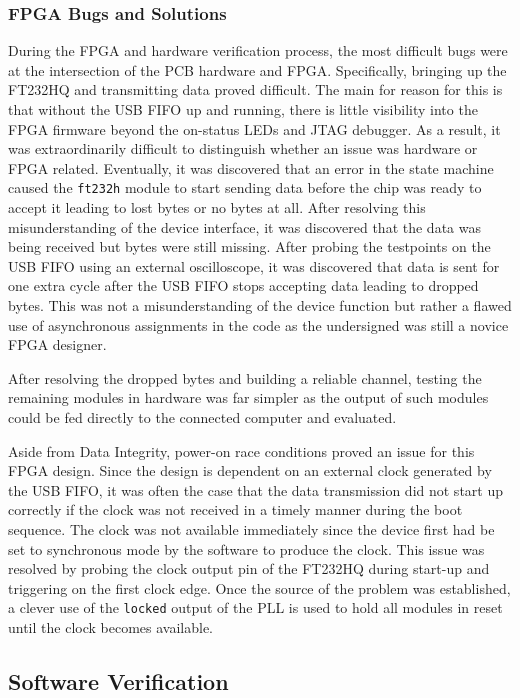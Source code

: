 \documentclass[letterpaper,11pt]{article}
\newcommand{\code}[1]{\texttt{#1}}
\begin{document}
\subsubsection{FPGA Bugs and Solutions}
During the FPGA and hardware verification process, the most difficult bugs were
at the intersection of the PCB hardware and FPGA. Specifically, bringing up the
FT232HQ and transmitting data proved difficult. The main for reason for this is
that without the USB FIFO up and running, there is little visibility into the
FPGA firmware beyond the on-status LEDs and JTAG debugger. As a result, it was
extraordinarily difficult to distinguish whether an issue was hardware or FPGA
related. Eventually, it was discovered that an error in the state machine caused
the \code{ft232h} module to start sending data before the chip was ready to
accept it leading to lost bytes or no bytes at all. After resolving this
misunderstanding of the device interface, it was discovered that the data was
being received but bytes were still missing. After probing the testpoints on the
USB FIFO using an external oscilloscope, it was discovered that data is sent for
one extra cycle after the USB FIFO stops accepting data leading to dropped
bytes. This was not a misunderstanding of the device function but rather a
flawed use of asynchronous assignments in the code as the undersigned was still
a novice FPGA designer.

After resolving the dropped bytes and building a reliable channel, testing the
remaining modules in hardware was far simpler as the output of such modules
could be fed directly to the connected computer and evaluated.

Aside from Data Integrity, power-on race conditions proved an issue for this
FPGA design. Since the design is dependent on an external clock generated by the
USB FIFO, it was often the case that the data transmission did not start up
correctly if the clock was not received in a timely manner during the boot
sequence. The clock was not available immediately since the device first had be
set to synchronous mode by the software to produce the clock. This issue was
resolved by probing the clock output pin of the FT232HQ during start-up and
triggering on the first clock edge. Once the source of the problem was
established, a clever use of the \code{locked} output of the PLL is used to hold
all modules in reset until the clock becomes available.

\subsection{Software Verification} \label{sec:software-testing} %
\end{document}

